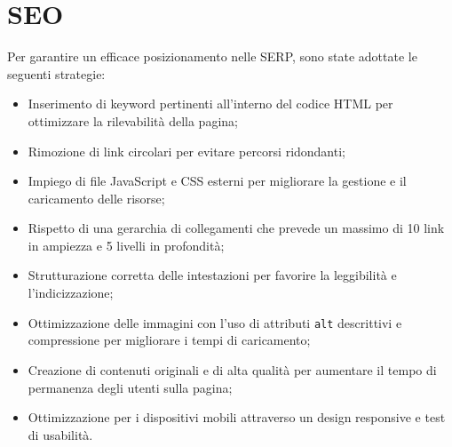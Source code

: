 \section{SEO}
Per garantire un efficace posizionamento nelle SERP, sono state adottate le seguenti strategie:
\begin{itemize}
\item Inserimento di keyword pertinenti all'interno del codice HTML per ottimizzare la rilevabilità della pagina;
\item Rimozione di link circolari per evitare percorsi ridondanti;
\item Impiego di file JavaScript e CSS esterni per migliorare la gestione e il caricamento delle risorse;
\item Rispetto di una gerarchia di collegamenti che prevede un massimo di 10 link in ampiezza e 5 livelli in profondità;
\item Strutturazione corretta delle intestazioni per favorire la leggibilità e l’indicizzazione;
\item Ottimizzazione delle immagini con l’uso di attributi \texttt{alt} descrittivi e compressione per migliorare i tempi di caricamento;
\item Creazione di contenuti originali e di alta qualità per aumentare il tempo di permanenza degli utenti sulla pagina;
\item Ottimizzazione per i dispositivi mobili attraverso un design responsive e test di usabilità.
\end{itemize}